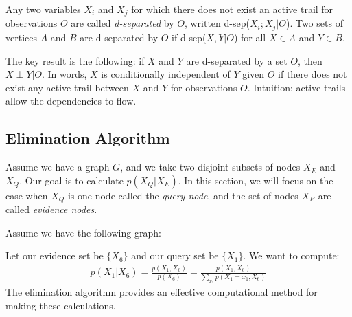 \documentclass[12pt]{report}
\begin{document}
Any two variables $X_i$ and $X_j$ for which there does not exist an
active trail for observations $O$ are called \emph{d-separated} by
$O$, written d-sep($X_i;X_j|O$). Two sets of vertices $A$ and $B$ are
d-separated by $O$ if d-sep($X,Y|O$) for all $X\in A$ and $Y\in B$. 

The key result is the following: if $X$ and $Y$ are d-separated by a
set $O$, then $X \perp Y | O$. In words, $X$ is conditionally
independent of $Y$ given $O$ if there does not exist any active trail
between $X$ and $Y$ for observations $O$. Intuition: active trails allow the
dependencies to flow. 

\subsection{Elimination Algorithm}
Assume we have a graph $G$, and we take two disjoint subsets of
nodes $X_E$ and $X_Q$. Our goal is to calculate $p(X_Q|X_E)$. In this
section, we will focus on the case when $X_Q$ is one node called the
\emph{query node}, and the set of nodes $X_E$ are called
\emph{evidence nodes}.

Assume we have the following graph:
\begin{center}
\end{center}
Let our evidence set be $\{X_6\}$ and our query set be $\{X_1\}$. We
want to compute:
\begin{align*}
p(X_1|X_6) = \frac{p(X_1,X_6)}{p(X_6)} = \frac{p(X_1,X_6)}{\sum_{x_1}p(X_1=x_1,X_6)}
\end{align*}
The elimination algorithm provides an effective computational method
for making these calculations. 
\end{document}
